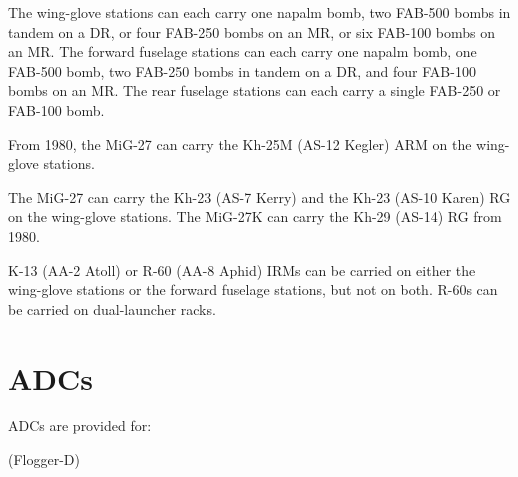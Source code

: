 The wing-glove stations can each carry one napalm bomb, two FAB-500 bombs in tandem on a DR, or four FAB-250 bombs on an MR, or six FAB-100 bombs on an MR. The forward fuselage stations can each carry one napalm bomb, one FAB-500 bomb, two FAB-250 bombs in tandem on a DR, and four FAB-100 bombs on an MR. The rear fuselage stations can each carry a single FAB-250 or FAB-100 bomb.%

From 1980, the MiG-27 can carry the Kh-25M (AS-12 Kegler) ARM on the wing-glove stations.%

The MiG-27 can carry the Kh-23 (AS-7 Kerry) and the Kh-23 (AS-10 Karen) RG on the wing-glove stations. The MiG-27K can carry the Kh-29 (AS-14) RG from 1980.%

K-13 (AA-2 Atoll) or R-60 (AA-8 Aphid) IRMs can be carried on either the wing-glove stations or the forward fuselage stations, but not on both.
R-60s can be carried on dual-launcher racks.%

\section{ADCs}
ADCs are provided for:
\begin{itemize}
         (Flogger-D)
\end{itemize}

\listofnotes
